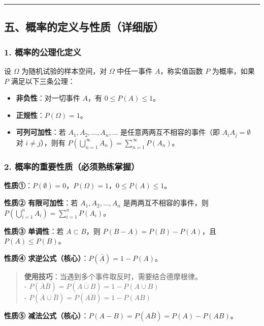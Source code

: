 \documentclass[12pt,a4paper]{ctexart}
\newenvironment{myquote}
  {\par\vspace{0.5em}\begin{quote}\sffamily\color{darkgray}}
  {\end{quote}\vspace{0.5em}}
\begin{document}
\vspace{1em}\hrule\vspace{1em}

\subsection{五、概率的定义与性质（详细版）}

\subsubsection{1. 概率的公理化定义}
设 $\Omega$ 为随机试验的样本空间，对 $\Omega$ 中任一事件 $A$，称实值函数 $P$ 为概率，如果 $P$ 满足以下三条公理：

\begin{itemize}[noitemsep]
    \item \textbf{非负性}：对一切事件 $A$，有 $0 \le P(A) \le 1$。
    \item \textbf{正规性}：$P(\Omega) = 1$。
    \item \textbf{可列可加性}：若 $A_1, A_2, \dots, A_n, \dots$ 是任意两两互不相容的事件（即 $A_i A_j = \emptyset$ 对 $i \ne j$），则有 $P(\bigcup_{n=1}^{\infty} A_n) = \sum_{n=1}^{\infty} P(A_n)$。
\end{itemize}

\subsubsection{2. 概率的重要性质（必须熟练掌握）}

\textbf{性质①}：$P(\emptyset) = 0$，$P(\Omega) = 1$，$0 \le P(A) \le 1$。

\textbf{性质② 有限可加性}：若 $A_1, A_2, \dots, A_n$ 是两两互不相容的事件，则 $P(\bigcup_{i=1}^n A_i) = \sum_{i=1}^n P(A_i)$。

\textbf{性质③ 单调性}：若 $A \subset B$，则 $P(B-A) = P(B) - P(A)$，且 $P(A) \le P(B)$。

\textbf{性质④ 求逆公式（核心）}：$P(\bar{A}) = 1 - P(A)$。

\begin{myquote}
    \textbf{使用技巧}：当遇到多个事件取反时，需要结合德摩根律。\\
    - $P(\bar{A}\bar{B}) = P(\overline{A \cup B}) = 1 - P(A \cup B)$ \\
    - $P(\bar{A} \cup \bar{B}) = P(\overline{AB}) = 1 - P(AB)$
\end{myquote}

\textbf{性质⑤ 减法公式（核心）}：$P(A - B) = P(A\bar{B}) = P(A) - P(AB)$。
\end{document}
